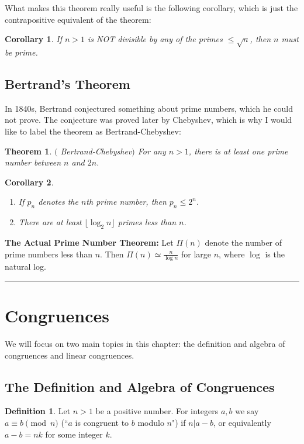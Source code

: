 \documentclass[12pt]{article}
\theoremstyle{plain}
\newtheorem{corollary}{Corollary}
\newtheorem{theorem}{Theorem}
\theoremstyle{definition}
\newtheorem{definition}{Definition}
\theoremstyle{remark}
\begin{document}
\bigskip
\noindent
What makes this theorem really useful is the following corollary, which is just the contrapositive equivalent of the theorem:
\begin{corollary}
If $n>1$ is NOT divisible by any of the primes $\leq \sqrt{n}$, then $n$ must be prime. 
\end{corollary}

\bigskip
\subsection{Bertrand's Theorem}
In 1840s, Bertrand conjectured something about prime numbers, which he could not prove. The conjecture was proved later by Chebyshev, which is why I would like to label the theorem as Bertrand-Chebyshev:
\begin{theorem}$($ Bertrand-Chebyshev$)$
For any $n>1$, there is at least one prime number between $n$ and $2n$. 
\end{theorem}

\bigskip
\begin{corollary}\begin{enumerate}
    \item If $p_n$ denotes the $n$th prime number, then $p_n \leq 2^n$.
    \item There are at least $\lfloor \log_2n\rfloor $ primes less than $n$. 
\end{enumerate}
\end{corollary}

\bigskip
\noindent
{\bf The Actual Prime Number Theorem:} Let $\Pi(n)$ denote the number of prime numbers less than $n$. Then $\Pi(n) \simeq \frac{n}{\log n}$ for large $n$, where $\log$ is the natural log.

\bigskip
\hrule

\section{Congruences}
We will focus on two main topics in this chapter: the definition and algebra of congruences and linear congruences.
\subsection{The Definition and Algebra of Congruences}
\begin{definition}
Let $n>1$ be a positive number. For integers $a,b$ we say $a\equiv b \pmod{n}$ (``$a$ is congruent to $b$ modulo $n$") if $n|a-b$, or equivalently $a-b=nk$ for some integer $k$. 
\end{definition}
\end{document}
